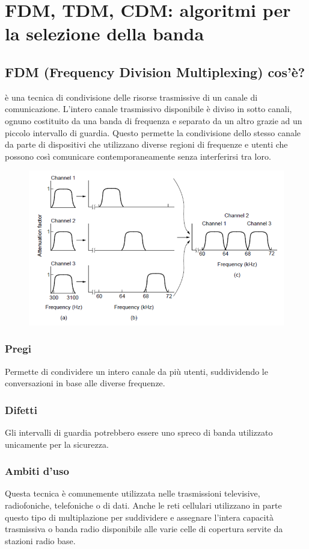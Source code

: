\section{FDM, TDM, CDM: algoritmi per la selezione della banda}
\subsection{FDM (Frequency Division Multiplexing) cos'è?}
è una tecnica di condivisione delle risorse trasmissive di un canale di comunicazione. L'intero canale trasmissivo disponibile è diviso in sotto canali, ognuno costituito da una banda di frequenza e separato da un altro grazie ad un piccolo intervallo di guardia.
Questo permette la condivisione dello stesso canale da parte di dispositivi che utilizzano diverse regioni di frequenze e utenti che possono così comunicare contemporaneamente senza interferirsi tra loro.

\begin{figure}[H]
\centering
\includegraphics[scale=0.45]{res/img/11_FDM.png}
\end{figure}
\subsubsection{Pregi}
Permette di condividere un intero canale da più utenti, suddividendo le conversazioni in base alle diverse frequenze.
\subsubsection{Difetti}
Gli intervalli di guardia potrebbero essere uno spreco di banda utilizzato unicamente per la sicurezza.
\subsubsection{Ambiti d'uso}
Questa tecnica è comunemente utilizzata nelle trasmissioni televisive, radiofoniche, telefoniche o di dati. Anche le reti cellulari utilizzano in parte questo tipo di multiplazione per suddividere e assegnare l'intera capacità trasmissiva o banda radio disponibile alle varie celle di copertura servite da stazioni radio base.

